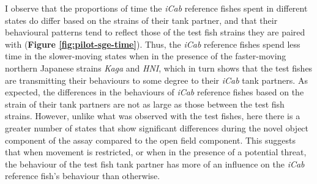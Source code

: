 \documentclass[
]{book}
\begin{document}
I observe that the proportions of time the \emph{iCab} reference fishes spent in different states do differ based on the strains of their tank partner, and that their behavioural patterns tend to reflect those of the test fish strains they are paired with (\textbf{Figure \ref{fig:pilot-sge-time}}). Thus, the \emph{iCab} reference fishes spend less time in the slower-moving states when in the presence of the faster-moving northern Japanese strains \emph{Kaga} and \emph{HNI}, which in turn shows that the test fishes are transmitting their behaviours to some degree to their \emph{iCab} tank partners. As expected, the differences in the behaviours of \emph{iCab} reference fishes based on the strain of their tank partners are not as large as those between the test fish strains. However, unlike what was observed with the test fishes, here there is a greater number of states that show significant differences during the novel object component of the assay compared to the open field component. This suggests that when movement is restricted, or when in the presence of a potential threat, the behaviour of the test fish tank partner has more of an influence on the \emph{iCab} reference fish's behaviour than otherwise.
\end{document}

